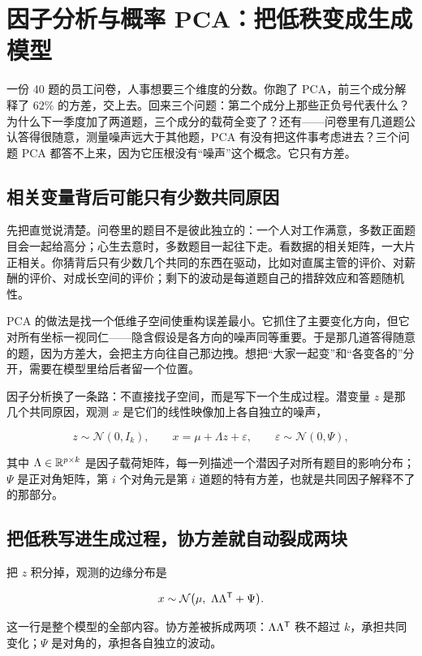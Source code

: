\section{因子分析与概率 PCA：把低秩变成生成模型}
\label{sec:13-Machine-Learning/04-Dimensionality-Reduction/06}

一份 40 题的员工问卷，人事想要三个维度的分数。你跑了 PCA，前三个成分解释了 \(62\%\) 的方差，交上去。回来三个问题：第二个成分上那些正负号代表什么？为什么下一季度加了两道题，三个成分的载荷全变了？还有——问卷里有几道题公认答得很随意，测量噪声远大于其他题，PCA 有没有把这件事考虑进去？三个问题 PCA 都答不上来，因为它压根没有``噪声''这个概念。它只有方差。

\subsection{相关变量背后可能只有少数共同原因}

先把直觉说清楚。问卷里的题目不是彼此独立的：一个人对工作满意，多数正面题目会一起给高分；心生去意时，多数题目一起往下走。看数据的相关矩阵，一大片正相关。你猜背后只有少数几个共同的东西在驱动，比如对直属主管的评价、对薪酬的评价、对成长空间的评价；剩下的波动是每道题自己的措辞效应和答题随机性。

PCA 的做法是找一个低维子空间使重构误差最小。它抓住了主要变化方向，但它对所有坐标一视同仁——隐含假设是各方向的噪声同等重要。于是那几道答得随意的题，因为方差大，会把主方向往自己那边拽。想把``大家一起变''和``各变各的''分开，需要在模型里给后者留一个位置。

因子分析换了一条路：不直接找子空间，而是写下一个生成过程。潜变量 \(z\) 是那几个共同原因，观测 \(x\) 是它们的线性映像加上各自独立的噪声，

\[
z\sim\mathcal N(0,I_k),
\qquad
x=\mu+\Lambda z+\varepsilon,
\qquad
\varepsilon\sim\mathcal N(0,\Psi),
\]

其中 \(\Lambda\in\mathbb{R}^{p\times k}\) 是因子载荷矩阵，每一列描述一个潜因子对所有题目的影响分布；\(\Psi\) 是正对角矩阵，第 \(i\) 个对角元是第 \(i\) 道题的特有方差，也就是共同因子解释不了的那部分。

\subsection{把低秩写进生成过程，协方差就自动裂成两块}

把 \(z\) 积分掉，观测的边缘分布是

\[
x\sim\mathcal N\bigl(\mu,\ \Lambda\Lambda^{\trans}+\Psi\bigr).
\]

这一行是整个模型的全部内容。协方差被拆成两项：\(\Lambda\Lambda^{\mathsf{T}}\) 秩不超过 \(k\)，承担共同变化；\(\Psi\) 是对角的，承担各自独立的波动。

